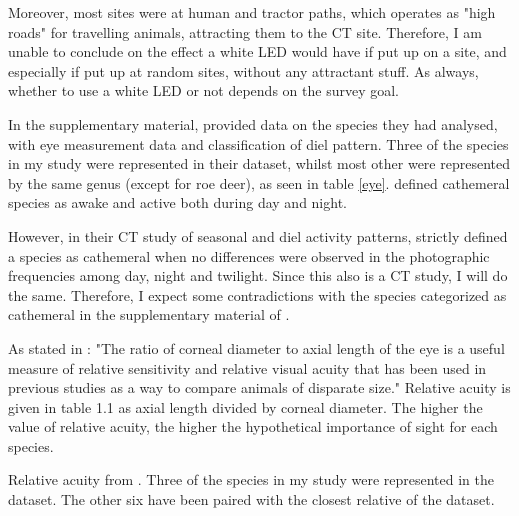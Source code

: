 Moreover, most sites were at human and tractor paths, which operates as "high roads" for travelling animals, attracting them to the CT site. Therefore, I am unable to conclude on the effect a white LED would have if put up on a site, and especially if put up at random sites, without any attractant stuff. As always, whether to use a white LED or not depends on the survey goal.

In the supplementary material, \textcite{Hall2012} provided data on the species they had analysed, with eye measurement data and classification of diel pattern. Three of the species in my study were represented in their dataset, whilst most other were represented by the same genus (except for roe deer), as seen in table \ref{eye}.
\textcite{Hall2012} defined cathemeral species as awake and active both during day and night.

However, in their CT study of seasonal and diel activity patterns, \textcite{Ikeda2016} strictly defined a species as cathemeral when no differences were observed in the photographic frequencies among day, night and twilight.
Since this also is a CT study, I will do the same. Therefore, I expect some contradictions with the species categorized as cathemeral in the supplementary material of \textcite{Hall2012}.

As stated in \textcite{Hall2012}:
"The ratio of corneal diameter to axial length of the eye is a useful measure of relative sensitivity and relative visual acuity that has been used in previous studies as a way to compare animals of disparate size."
Relative acuity is given in table 1.1 as axial length divided by corneal diameter.
The higher the value of relative acuity, the higher the hypothetical importance of sight for each species.
\begin{table}
	\centering
	\caption[Data from Hall et al. 2012]
	{\footnotesize Relative acuity from \textcite{Hall2012}. Three of the species in my study were represented in the dataset. The other six have been paired with the closest relative of the dataset.}
	\label{eye}
	\small
	
\end{table}



